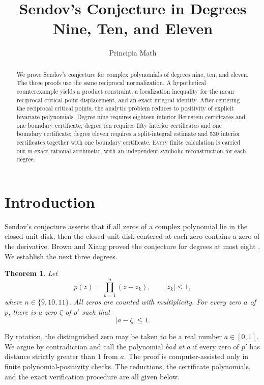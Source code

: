 \documentclass[11pt]{article}
\title{Sendov's Conjecture in Degrees Nine, Ten, and Eleven}
\author{Principia Math}
\date{}
\newtheorem{theorem}{Theorem}[section]
\theoremstyle{remark}
\begin{document}
\maketitle

\begin{abstract}
We prove Sendov's conjecture for complex polynomials of degrees nine, ten, and
 eleven.  The three proofs use the same reciprocal normalization.  A
 hypothetical counterexample yields a product constraint, a localization
 inequality for the mean reciprocal critical-point displacement, and an exact
 integral identity.  After centering the reciprocal critical points, the
 analytic problem reduces to positivity of explicit bivariate polynomials.
 Degree nine requires eighteen interior Bernstein certificates and one
 boundary certificate; degree ten requires fifty interior certificates and one
 boundary certificate; degree eleven requires a split-integral estimate and
 530 interior certificates together with one boundary certificate.  Every
 finite calculation is carried out in exact rational arithmetic, with an
 independent symbolic reconstruction for each degree.
\end{abstract}

\section{Introduction}

Sendov's conjecture asserts that if all zeros of a complex polynomial lie in
 the closed unit disk, then the closed unit disk centered at each zero contains
 a zero of the derivative.  Brown and Xiang proved the conjecture for degrees
 at most eight \cite{BrownXiang}.  We establish the next three degrees.

\begin{theorem}\label{thm:main}
Let
\[
 p(z)=\prod_{k=1}^{n}(z-z_k),\qquad |z_k|\le 1,
\]
where $n\in\{9,10,11\}$.  All zeros are counted with multiplicity.  For every zero $a$ of $p$, there is a zero $\zeta$
 of $p'$ such that
\[
 |a-\zeta|\le 1.
\]
\end{theorem}

By rotation, the distinguished zero may be taken to be a real number
$a\in[0,1]$.  We argue by contradiction and call the polynomial \emph{bad at
$a$} if every zero of $p'$ has distance strictly greater than $1$ from $a$.
The proof is computer-assisted only in finite polynomial-positivity checks.
The reductions, the certificate polynomials, and the exact verification
procedure are all given below.
\end{document}

